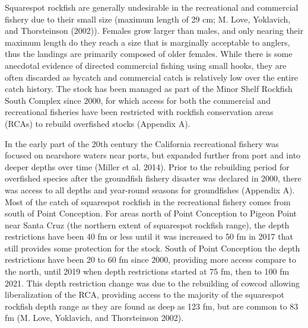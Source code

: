 \documentclass[11pt,
  english,
  a4paper,
]{article}
\begin{document}
\leavevmode\tagmcend\tagstructend


Squarespot rockfish are generally undesirable in the recreational and commercial fishery due to their small size (maximum length of 29 cm; {M. Love, Yoklavich, and Thorsteinson (2002)\leavevmode\tagmcend\tagstructend}). Females grow larger than males, and only nearing their maximum length do they reach a size that is marginally acceptable to anglers, thus the landings are primarily composed of older females. While there is some anecdotal evidence of directed commercial fishing using small hooks, they are often discarded as bycatch and commercial catch is relatively low over the entire catch history. The stock has been managed as part of the Minor Shelf Rockfish South Complex since 2000, for which access for both the commercial and recreational fisheries have been restricted with rockfish conservation areas (RCAs) to rebuild overfished stocks (Appendix A).

\leavevmode\tagmcend\tagstructend\par


In the early part of the 20th century the California recreational fishery was focused on nearshore waters near ports, but expanded further from port and into deeper depths over time {(Miller et al. 2014)\leavevmode\tagmcend\tagstructend}. Prior to the rebuilding period for overfished species after the groundfish fishery disaster was declared in 2000, there was access to all depths and year-round seasons for groundfishes (Appendix A). Most of the catch of squarespot rockfish in the recreational fishery comes from south of Point Conception. For areas north of Point Conception to Pigeon Point near Santa Cruz (the northern extent of squarespot rockfish range), the depth restrictions have been 40 fm or less until it was increased to 50 fm in 2017 that still provides some protection for the stock. South of Point Conception the depth restrictions have been 20 to 60 fm since 2000, providing more access compare to the north, until 2019 when depth restrictions started at 75 fm, then to 100 fm 2021. This depth restriction change was due to the rebuilding of cowcod allowing liberalization of the RCA, providing access to the majority of the squarespot rockfish depth range as they are found as deep as 123 fm, but are common to 83 fm {(M. Love, Yoklavich, and Thorsteinson 2002)\leavevmode\tagmcend\tagstructend}.
\end{document}

